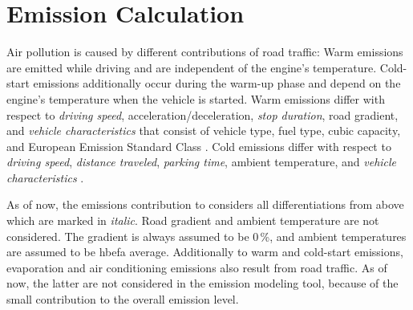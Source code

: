 \section{Emission Calculation}
\label{ch:emissions:overview}
%
Air pollution is caused by different contributions of road traffic:
%
Warm emissions are emitted while driving and are independent of the engine's temperature.
%
Cold-start emissions additionally occur during the warm-up phase and depend on the engine's temperature when the vehicle is started.
%
Warm emissions differ with respect to \emph{driving speed}, acceleration/deceleration, \emph{stop duration}, road gradient, and \emph{vehicle characteristics} that consist of vehicle type, fuel type, cubic capacity, and European Emission Standard Class \citep{AndreRapone_Atmos_2009}.
%
Cold emissions differ with respect to \emph{driving speed}, \emph{distance traveled}, \emph{parking time}, ambient temperature, and \emph{vehicle characteristics} \citep{WeilenmannEtAl_Atmos_2009}.

As of now, the emissions contribution to  considers all differentiations from above which are marked in \emph{italic}. Road gradient and ambient temperature are not considered. The gradient is always assumed to be 0\,\%, and ambient temperatures are assumed to be \gls{hbefa} average.
%
Additionally to warm and cold-start emissions, evaporation and air conditioning emissions also result from road traffic. As of now, the latter are not considered in the emission modeling tool, because of the small contribution to the overall emission level.

